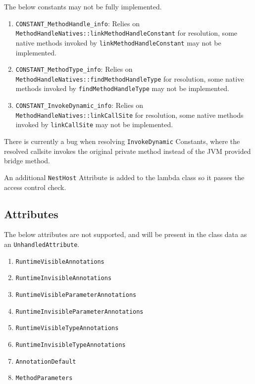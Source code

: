The below constants may not be fully implemented.

\begin{enumerate}
\item \texttt{CONSTANT\_MethodHandle\_info}: Relies on \texttt{MethodHandleNatives::linkMethodHandleConstant} for resolution, some native methods invoked by \texttt{linkMethodHandleConstant} may not be implemented.
\item \texttt{CONSTANT\_MethodType\_info}: Relies on \texttt{MethodHandleNatives::findMethodHandleType} for resolution, some native methods invoked by \texttt{findMethodHandleType} may not be implemented.
\item \texttt{CONSTANT\_InvokeDynamic\_info}: Relies on \texttt{MethodHandleNatives::linkCallSite} for resolution, some native methods invoked by \texttt{linkCallSite} may not be implemented.
\end{enumerate}

There is currently a bug when resolving \texttt{InvokeDynamic} Constants, where the resolved callsite invokes the original private method instead of the JVM provided bridge method.

An additional \texttt{NestHost} Attribute is added to the lambda class so it passes the access control check.

\addtocounter{subsection}{2}
\subsection{Attributes}

The below attributes are not supported, and will be present in the class data as an \texttt{UnhandledAttribute}.

\begin{enumerate}
	\item \texttt{RuntimeVisibleAnnotations}
	\item \texttt{RuntimeInvisibleAnnotations}
	\item \texttt{RuntimeVisibleParameterAnnotations}
	\item \texttt{RuntimeInvisibleParameterAnnotations}
	\item \texttt{RuntimeVisibleTypeAnnotations}
	\item \texttt{RuntimeInvisibleTypeAnnotations}
	\item \texttt{AnnotationDefault}
	\item \texttt{MethodParameters}
\end{enumerate}

\addtocounter{subsection}{2}
